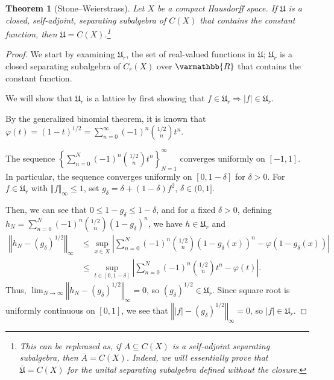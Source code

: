 \documentclass[10pt]{extarticle}
\newcommand{\R}{\mathbb{R}}
\newcommand{\norm}[1]{\left\Vert #1\right\Vert}
\newcommand{\set}[1]{\left\{#1\right\}}
\theoremstyle{plain}
\newtheorem*{theorem}{Theorem}
\theoremstyle{definition}
\theoremstyle{note}
\renewcommand*{\mathbb}[1]{\varmathbb{#1}}
\renewcommand{\newline}{\hfill\break}
\begin{document}
\begin{theorem}[Stone--Weierstrass]
  Let $X$ be a compact Hausdorff space. If $\mathfrak{U}$ is a closed, self-adjoint, separating subalgebra of $C(X)$ that contains the constant function, then $\mathfrak{U} = C(X)$.\footnote{This can be rephrased as, if $A\subseteq C(X)$ is a self-adjoint separating subalgebra, then $\overline{A} = C(X)$. Indeed, we will essentially prove that $\overline{\mathfrak{U}} = C(X)$ for the unital separating subalgebra defined without the closure.}
\end{theorem}
\begin{proof}
  We start by examining $\mathfrak{U}_r$, the set of real-valued functions in $\mathfrak{U}$; $\mathfrak{U}_r$ is a closed separating subalgebra of $C_{r}(X)$ over $\R$ that contains the constant function.\newline

  We will show that $\mathfrak{U}_r$ is a lattice by first showing that $f\in \mathfrak{U}_r \Rightarrow |f|\in \mathfrak{U}_r$.\newline

  By the generalized binomial theorem, it is known that $\varphi(t) = \left(1-t\right)^{1/2} = \sum_{n=0}^{\infty}(-1)^n{1/2 \choose n}t^n$.\newline

  The sequence $\set{\sum_{n=0}^{N}(-1)^n{1/2 \choose n}t^n}_{N=1}^{\infty}$ converges uniformly on $[-1,1]$. In particular, the sequence converges uniformly on $[0,1-\delta]$ for $\delta > 0$. For $f\in \mathfrak{U}_r$ with $\norm{f}_{\infty}\leq 1$, set $g_{\delta} = \delta + \left(1-\delta\right)f^{2}$, $\delta \in (0,1]$.\newline

  Then, we can see that $0\leq 1-g_{\delta} \leq 1-\delta$, and for a fixed $\delta > 0$, defining $h_{N} = \sum_{n=0}^{N}(-1)^n{1/2 \choose n}\left(1-g_{\delta}\right)^{n}$, we have $h\in \mathfrak{U}_r$ and
  \begin{align*}
    \norm{h_{N} - \left(g_{\delta}\right)^{1/2}}_{\infty} &\leq \sup_{x\in X}\left\vert \sum_{n=0}^{N}(-1)^n{1/2 \choose n}\left(1-g_{\delta}(x)\right)^{n} - \varphi\left(1-g_{\delta}(x)\right) \right\vert\\
                                       &\leq \sup_{t\in [0,1-\delta]}\left\vert \sum_{n=0}^{N}(-1)^n{1/2 \choose n}t^{n} - \varphi\left(t\right) \right\vert.
  \end{align*}
  Thus, $\lim_{N\rightarrow\infty}\norm{h_N - \left(g_{\delta}\right)^{1/2}}_{\infty} = 0$, so $\left(g_{\delta}\right)^{1/2}\in \mathfrak{U}_r$. Since square root is uniformly continuous on $[0,1]$, we see that $\norm{|f|-\left(g_{\delta}\right)^{1/2}}_{\infty} = 0$, so $|f|\in \mathfrak{U}_r$.\newline


\end{proof}
\end{document}
